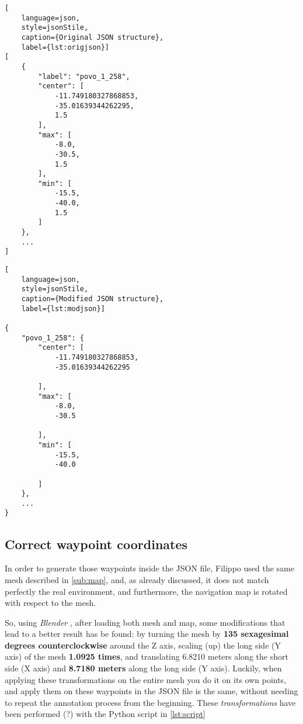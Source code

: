 \noindent\begin{minipage}{0.425\textwidth}
\noindent\begin{lstlisting}[
    language=json,
    style=jsonStile,
    caption={Original JSON structure},
    label={lst:origjson}]
[
    {
        "label": "povo_1_258",
        "center": [
            -11.749180327868853,
            -35.01639344262295,
            1.5
        ],
        "max": [
            -8.0,
            -30.5,
            1.5
        ],
        "min": [
            -15.5,
            -40.0,
            1.5
        ]
    },
    ...
]
\end{lstlisting}
\end{minipage}
\noindent\begin{minipage}{0.15\textwidth}
    \centering
    \noindent{}
\end{minipage}
\noindent\begin{minipage}{0.425\textwidth}
\noindent\begin{lstlisting}[
    language=json,
    style=jsonStile,
    caption={Modified JSON structure},
    label={lst:modjson}]

{
    "povo_1_258": {
        "center": [
            -11.749180327868853,
            -35.01639344262295

        ],
        "max": [
            -8.0,
            -30.5

        ],
        "min": [
            -15.5,
            -40.0

        ]
    },
    ...
}
\end{lstlisting}
\end{minipage}


\subsection{Correct waypoint coordinates}
\label{sub:waypoints}

In order to generate those waypoints inside the JSON file, Filippo used the same mesh described in \autoref{sub:map}, and, as already discussed, it does not match perfectly the real environment, and furthermore, the navigation map is rotated with respect to the mesh.

So, using \textit{Blender} \cite{blender}, after loading both mesh and map, some modifications that lead to a better result has be found: by turning the mesh by \textbf{135 sexagesimal degrees counterclockwise} around the Z axis, scaling (up) the long side (Y axis) of the mesh \textbf{1.0925 times}, and translating 6.8210 meters along the short side (X axis) and \textbf{8.7180 meters} along the long side (Y axis). Luckily, when applying these transformations on the entire mesh you do it on its own points, and apply them on these waypoints in the JSON file is the same, without needing to repeat the annotation process from the beginning. These \textit{transformations} have been performed (?) with the Python script in \autoref{lst:script}

